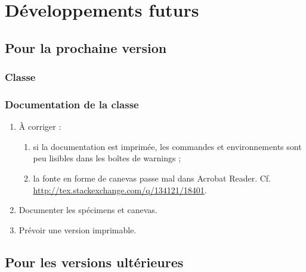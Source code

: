 \chapter{Développements futurs}\label{cha-devel-futurs}

\section{Pour la prochaine version}
\label{sec-pour-la-prochaine}

\subsection{Classe}


\subsection{Documentation de la classe}
\label{sec-documentation-de-la}

\begin{enumerate}
\item À corriger :
  \begin{enumerate}
  \item si la documentation est imprimée, les commandes et environnements sont
    peu lisibles dans les boîtes de warnings ;
  \item la fonte en forme de canevas passe mal dans Acrobat
    Reader. Cf. \url{http://tex.stackexchange.com/q/134121/18401}.
  \end{enumerate}
\item Documenter les spécimens et canevas.
\item Prévoir une version imprimable.
\end{enumerate}

\section{Pour les versions ultérieures}
\label{sec-pour-les-versions}

